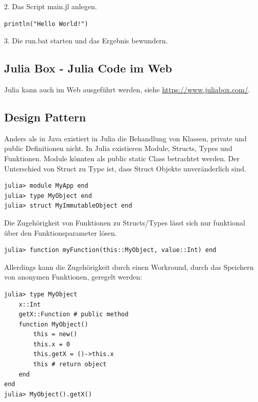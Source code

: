\documentclass[11pt]{article}
\begin{document}
\noindent\begin{minipage}{\textwidth}
2. Das Script main.jl anlegen.
\begin{lstlisting}
println("Hello World!")
\end{lstlisting}
\end{minipage}

3. Die run.bat starten und das Ergebnis bewundern.

\subsection{Julia Box - Julia Code im Web}
Julia kann auch im Web ausgeführt werden, siehe \url{https://www.juliabox.com/}.

\subsection{Design Pattern}
\noindent\begin{minipage}{\textwidth}
Anders als in Java existiert in Julia die Behandlung von Klassen, private und public Definitionen nicht. In Julia existieren Module, Structs, Types und Funktionen. Module könnten als public static Class betrachtet werden. Der Unterschied von Struct zu Type ist, dass Struct Objekte unveränderlich sind.

\begin{lstlisting}
julia> module MyApp end
julia> type MyObject end
julia> struct MyImmutableObject end
\end{lstlisting}
\end{minipage}

\noindent\begin{minipage}{\textwidth}
Die Zugehörigkeit von Funktionen zu Structs/Types lässt sich nur funktional über den Funktionsparameter lösen.
\begin{lstlisting}
julia> function myFunction(this::MyObject, value::Int) end
\end{lstlisting}
\end{minipage}

\noindent\begin{minipage}{\textwidth}
Allerdings kann die Zugehörigkeit durch einen Workround, durch das Speichern von anonymen Funktionen, geregelt werden:
\begin{lstlisting}
julia> type MyObject
	x::Int
	getX::Function # public method
	function MyObject()
		this = new()
		this.x = 0
		this.getX = ()->this.x
		this # return object
	end
end
julia> MyObject().getX()
\end{lstlisting}
\end{minipage}
\end{document}
